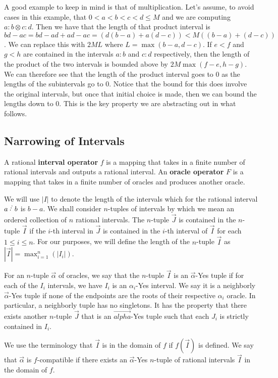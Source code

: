 \documentclass[12pt]{article}
\begin{document}
A good example to keep in mind is that of multiplication. Let's assume, to avoid cases in this example, that  $0 < a < b < c < d \leq M$ and we are computing $a:b \otimes c:d$. Then we have that the length of that product interval is $bd-ac = bd-ad+ad - ac= (d(b-a) + a(d-c))< M ( ( b-a) + (d-c) )$. We can replace this with $2ML$ where $L = \max(b-a, d-c)$. If $e<f$ and $g<h$ are contained in the intervals $a:b$ and $c:d$ respectively, then the length of the product of the two intervals is bounded above by $2M\max(f-e, h-g)$. We can therefore see that the length of the product interval goes to 0 as the lengths of the subintervals go to 0. Notice that the bound for this does involve the original intervals, but once that initial choice is made, then we can bound the lengths down to 0. This is the key property we are abstracting out in what follows. 

\subsection{Narrowing of Intervals}\label{sec:nrwint}

A rational \textbf{interval operator} $f$ is a mapping that takes in a finite number of rational intervals and outputs a rational interval. An \textbf{oracle operator} $F$ is a mapping that takes in a finite number of oracles and produces another oracle.

We will use $|I|$ to denote the length of the intervals which for the rational interval $a\lte b$ is $b-a$. We shall consider $n$-tuples of intervals by which we mean an ordered collection of $n$ rational intervals. The $n$-tuple $\vec{J}$ is contained in the $n$-tuple $\vec{I}$ if the $i$-th interval in $\vec{J}$ is contained in the $i$-th interval of $\vec{I}$ for each $1 \leq i \leq n$. For our purposes, we will define the length of the $n$-tuple $\vec{I}$ as $|\vec{I}| = \max_{i=1}^n (|I_i|)$.

For an $n$-tuple $\vec{\alpha}$ of oracles, we say that the $n$-tuple $\vec{I}$ is an $\vec{\alpha}$-Yes tuple if for each of the $I_i$ intervals, we have $I_i$ is an $\alpha_i$-Yes interval. We say it is a neighborly $\vec{\alpha}$-Yes tuple if none of the endpoints are the roots of their respective $\alpha_i$ oracle. In particular, a neighborly tuple has no singletons. It has the property that there exists another $n$-tuple $\vec{J}$ that is an $\vec{alpha}$-Yes tuple such that each $J_i$ is strictly contained in $I_i$.

We use the terminology that $\vec{I}$ is in the domain of $f$ if $f(\vec{I})$ is defined. We say that $\vec{\alpha}$ is $f$-compatible if there exists an $\vec{\alpha}$-Yes $n$-tuple of rational intervals $\vec{I}$ in the domain of $f$. 
\end{document}
